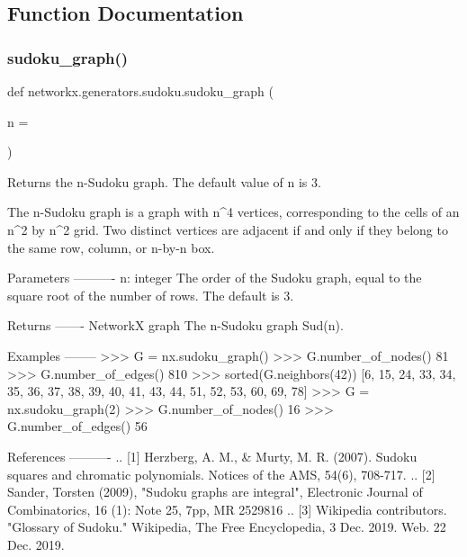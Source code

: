 \subsection{Function Documentation}
\mbox{\label{namespacenetworkx_1_1generators_1_1sudoku_a09100a391a388520c07374f6cd612b3d}} 
\subsubsection{\texorpdfstring{sudoku\+\_\+graph()}{sudoku\_graph()}}
{\footnotesize\ttfamily def networkx.\+generators.\+sudoku.\+sudoku\+\_\+graph (\begin{DoxyParamCaption}\item[{}]{n = {} }\end{DoxyParamCaption})}

\begin{DoxyVerb}Returns the n-Sudoku graph. The default value of n is 3.

The n-Sudoku graph is a graph with n^4 vertices, corresponding to the
cells of an n^2 by n^2 grid. Two distinct vertices are adjacent if and
only if they belong to the same row, column, or n-by-n box.

Parameters
----------
n: integer
   The order of the Sudoku graph, equal to the square root of the
   number of rows. The default is 3.

Returns
-------
NetworkX graph
    The n-Sudoku graph Sud(n).

Examples
--------
>>> G = nx.sudoku_graph()
>>> G.number_of_nodes()
81
>>> G.number_of_edges()
810
>>> sorted(G.neighbors(42))
[6, 15, 24, 33, 34, 35, 36, 37, 38, 39, 40, 41, 43, 44, 51, 52, 53, 60, 69, 78]
>>> G = nx.sudoku_graph(2)
>>> G.number_of_nodes()
16
>>> G.number_of_edges()
56

References
----------
.. [1] Herzberg, A. M., & Murty, M. R. (2007). Sudoku squares and chromatic
   polynomials. Notices of the AMS, 54(6), 708-717.
.. [2] Sander, Torsten (2009), "Sudoku graphs are integral",
   Electronic Journal of Combinatorics, 16 (1): Note 25, 7pp, MR 2529816
.. [3] Wikipedia contributors. "Glossary of Sudoku." Wikipedia, The Free
   Encyclopedia, 3 Dec. 2019. Web. 22 Dec. 2019.
\end{DoxyVerb}
 